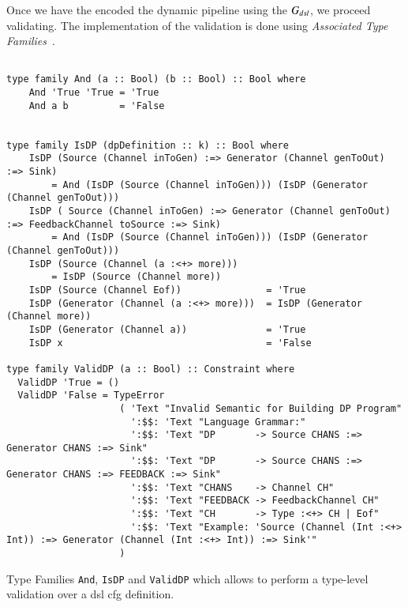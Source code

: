 Once we have the encoded the dynamic pipeline  using the  $G_{dsl}$, we proceed validating. The implementation of the validation is done using \emph{Associated Type Families}~\cite{associated-types}.

\begin{listing}[H]
  \begin{verbatim}

type family And (a :: Bool) (b :: Bool) :: Bool where
    And 'True 'True = 'True
    And a b         = 'False
  

type family IsDP (dpDefinition :: k) :: Bool where
    IsDP (Source (Channel inToGen) :=> Generator (Channel genToOut) :=> Sink)
        = And (IsDP (Source (Channel inToGen))) (IsDP (Generator (Channel genToOut)))
    IsDP ( Source (Channel inToGen) :=> Generator (Channel genToOut) :=> FeedbackChannel toSource :=> Sink)
        = And (IsDP (Source (Channel inToGen))) (IsDP (Generator (Channel genToOut)))
    IsDP (Source (Channel (a :<+> more)))     
        = IsDP (Source (Channel more))
    IsDP (Source (Channel Eof))               = 'True
    IsDP (Generator (Channel (a :<+> more)))  = IsDP (Generator (Channel more))
    IsDP (Generator (Channel a))              = 'True
    IsDP x                                    = 'False
     
type family ValidDP (a :: Bool) :: Constraint where
  ValidDP 'True = ()
  ValidDP 'False = TypeError
                    ( 'Text "Invalid Semantic for Building DP Program"
                      ':$$: 'Text "Language Grammar:"
                      ':$$: 'Text "DP       -> Source CHANS :=> Generator CHANS :=> Sink"
                      ':$$: 'Text "DP       -> Source CHANS :=> Generator CHANS :=> FEEDBACK :=> Sink"
                      ':$$: 'Text "CHANS    -> Channel CH"
                      ':$$: 'Text "FEEDBACK -> FeedbackChannel CH"
                      ':$$: 'Text "CH       -> Type :<+> CH | Eof"
                      ':$$: 'Text "Example: 'Source (Channel (Int :<+> Int)) :=> Generator (Channel (Int :<+> Int)) :=> Sink'"
                    )
  \end{verbatim}
  \caption[{[\texttt{Stage.hs}] Validating encoded in $G_{dsl}$ - FCF}]{Type Families \texttt{And}, \texttt{IsDP} and \texttt{ValidDP} which allows to perform a type-level validation over a \acrshort{dsl} \acrshort{cfg} definition.}
  \label{src:dpfh:4}
\end{listing}


